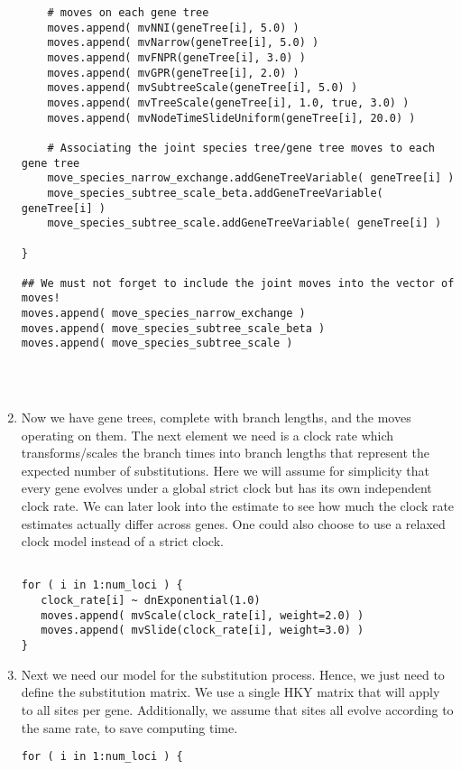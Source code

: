 \begin{enumerate}
{\begin{snugshade*}
\begin{lstlisting}
    # moves on each gene tree
    moves.append( mvNNI(geneTree[i], 5.0) )
    moves.append( mvNarrow(geneTree[i], 5.0) )
    moves.append( mvFNPR(geneTree[i], 3.0) )
    moves.append( mvGPR(geneTree[i], 2.0) )
    moves.append( mvSubtreeScale(geneTree[i], 5.0) )
    moves.append( mvTreeScale(geneTree[i], 1.0, true, 3.0) )
    moves.append( mvNodeTimeSlideUniform(geneTree[i], 20.0) )

    # Associating the joint species tree/gene tree moves to each gene tree
    move_species_narrow_exchange.addGeneTreeVariable( geneTree[i] )
    move_species_subtree_scale_beta.addGeneTreeVariable( geneTree[i] )
    move_species_subtree_scale.addGeneTreeVariable( geneTree[i] )

}

## We must not forget to include the joint moves into the vector of moves!
moves.append( move_species_narrow_exchange )
moves.append( move_species_subtree_scale_beta )
moves.append( move_species_subtree_scale )




\end{lstlisting}
\end{snugshade*}}


\item Now we have gene trees, complete with branch lengths, and the moves operating on them. 
The next element we need is a clock rate which transforms/scales the branch times into branch lengths that represent the expected number of substitutions.
Here we will assume for simplicity that every gene evolves under a global strict clock but has its own independent clock rate.
We can later look into the estimate to see how much the clock rate estimates actually differ across genes.
One could also choose to use a relaxed clock model instead of a strict clock.

{\tt \begin{snugshade*}
\begin{lstlisting}

for ( i in 1:num_loci ) { 
   clock_rate[i] ~ dnExponential(1.0)
   moves.append( mvScale(clock_rate[i], weight=2.0) )
   moves.append( mvSlide(clock_rate[i], weight=3.0) )
}
\end{lstlisting}
\end{snugshade*}}

\item Next we need our model for the substitution process. 
Hence, we just need to define the substitution matrix. 
We use a single HKY matrix that will apply to all sites per gene.
Additionally, we assume that sites all evolve according to the same rate, to save computing time.
{\tt \begin{snugshade*}
\begin{lstlisting}
for ( i in 1:num_loci ) {


\end{lstlisting}
\end{snugshade*}}
\end{enumerate}

